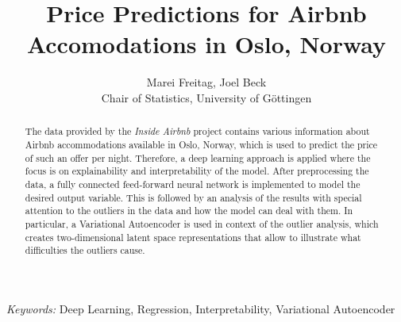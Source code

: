\begin{titlepage}

\title{\bf Price Predictions for Airbnb Accomodations in Oslo, Norway}

\author{Marei Freitag, Joel Beck \hspace{.2cm}\\ Chair of Statistics, University of G\"ottingen\\}

\maketitle

\bigskip

\begin{abstract}
    The data provided by the \emph{Inside Airbnb} project contains various information about Airbnb accommodations available in Oslo, Norway, which is used to predict the price of such an offer per night. Therefore, a deep learning approach is applied where the focus is on explainability and interpretability of the model. After preprocessing the data, a fully connected feed-forward neural network is implemented to model the desired output variable. This is followed by an analysis of the results with special attention to the outliers in the data and how the model can deal with them. In particular, a Variational Autoencoder is used in context of the outlier analysis, which creates two-dimensional latent space representations that allow to illustrate what difficulties the outliers cause.
\end{abstract}

\noindent%
    {\it Keywords:}  Deep Learning, Regression, Interpretability, Variational Autoencoder
\vfill

\end{titlepage}
